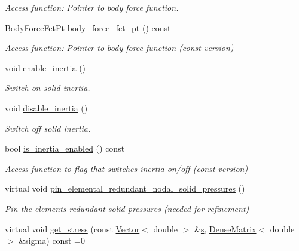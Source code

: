 \begin{DoxyCompactItemize}
\begin{DoxyCompactList}\small\item\em Access function\+: Pointer to body force function. \end{DoxyCompactList}\item 
\hyperlink{classoomph_1_1LinearElasticityEquationsBase_ada2fc7aa2569c35e28982f93a0749903}{Body\+Force\+Fct\+Pt} \hyperlink{classoomph_1_1LinearElasticityEquationsBase_a130b8253d200db0ace5fbbe0b6e88455}{body\+\_\+force\+\_\+fct\+\_\+pt} () const
\begin{DoxyCompactList}\small\item\em Access function\+: Pointer to body force function (const version) \end{DoxyCompactList}\item 
void \hyperlink{classoomph_1_1LinearElasticityEquationsBase_ad69ad3d868ae9bbce38da212ca5ed4b7}{enable\+\_\+inertia} ()
\begin{DoxyCompactList}\small\item\em Switch on solid inertia. \end{DoxyCompactList}\item 
void \hyperlink{classoomph_1_1LinearElasticityEquationsBase_a148133abdf55b6e040724bc36f582757}{disable\+\_\+inertia} ()
\begin{DoxyCompactList}\small\item\em Switch off solid inertia. \end{DoxyCompactList}\item 
bool \hyperlink{classoomph_1_1LinearElasticityEquationsBase_aa0ce797b0daf6a28ba90dba764e565f7}{is\+\_\+inertia\+\_\+enabled} () const
\begin{DoxyCompactList}\small\item\em Access function to flag that switches inertia on/off (const version) \end{DoxyCompactList}\item 
virtual void \hyperlink{classoomph_1_1LinearElasticityEquationsBase_aee2dbde46c2c5eae21e47cc0fa3b9362}{pin\+\_\+elemental\+\_\+redundant\+\_\+nodal\+\_\+solid\+\_\+pressures} ()
\begin{DoxyCompactList}\small\item\em Pin the element\textquotesingle{}s redundant solid pressures (needed for refinement) \end{DoxyCompactList}\item 
virtual void \hyperlink{classoomph_1_1LinearElasticityEquationsBase_a2a68942bbdbe42a95e8c221fc5b1a322}{get\+\_\+stress} (const \hyperlink{classoomph_1_1Vector}{Vector}$<$ double $>$ \&\hyperlink{cfortran_8h_ab7123126e4885ef647dd9c6e3807a21c}{s}, \hyperlink{classoomph_1_1DenseMatrix}{Dense\+Matrix}$<$ double $>$ \&sigma) const =0

\end{DoxyCompactItemize}

